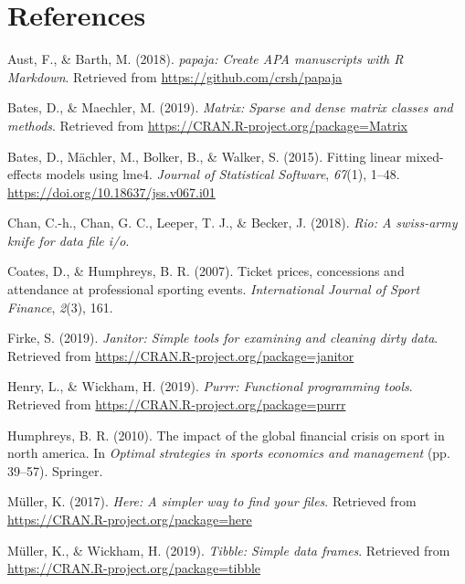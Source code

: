 \documentclass[man, fleqn, noextraspace,floatsintext]{apa6}
\begin{document}
\newpage

\section{References}\label{references}

\begingroup
\setlength{\parindent}{-0.5in} \setlength{\leftskip}{0.5in}

\hypertarget{refs}{}
\hypertarget{ref-R-papaja}{}
Aust, F., \& Barth, M. (2018). \emph{papaja: Create APA manuscripts with
R Markdown}. Retrieved from \url{https://github.com/crsh/papaja}

\hypertarget{ref-R-Matrix}{}
Bates, D., \& Maechler, M. (2019). \emph{Matrix: Sparse and dense matrix
classes and methods}. Retrieved from
\url{https://CRAN.R-project.org/package=Matrix}

\hypertarget{ref-R-lme4}{}
Bates, D., Mächler, M., Bolker, B., \& Walker, S. (2015). Fitting linear
mixed-effects models using lme4. \emph{Journal of Statistical Software},
\emph{67}(1), 1--48. \url{https://doi.org/10.18637/jss.v067.i01}

\hypertarget{ref-R-rio}{}
Chan, C.-h., Chan, G. C., Leeper, T. J., \& Becker, J. (2018).
\emph{Rio: A swiss-army knife for data file i/o}.

\hypertarget{ref-coates_humphreys_2007}{}
Coates, D., \& Humphreys, B. R. (2007). Ticket prices, concessions and
attendance at professional sporting events. \emph{International Journal
of Sport Finance}, \emph{2}(3), 161.

\hypertarget{ref-R-janitor}{}
Firke, S. (2019). \emph{Janitor: Simple tools for examining and cleaning
dirty data}. Retrieved from
\url{https://CRAN.R-project.org/package=janitor}

\hypertarget{ref-R-purrr}{}
Henry, L., \& Wickham, H. (2019). \emph{Purrr: Functional programming
tools}. Retrieved from \url{https://CRAN.R-project.org/package=purrr}

\hypertarget{ref-humphreys_2010}{}
Humphreys, B. R. (2010). The impact of the global financial crisis on
sport in north america. In \emph{Optimal strategies in sports economics
and management} (pp. 39--57). Springer.

\hypertarget{ref-R-here}{}
Müller, K. (2017). \emph{Here: A simpler way to find your files}.
Retrieved from \url{https://CRAN.R-project.org/package=here}

\hypertarget{ref-R-tibble}{}
Müller, K., \& Wickham, H. (2019). \emph{Tibble: Simple data frames}.
Retrieved from \url{https://CRAN.R-project.org/package=tibble}
\end{document}

